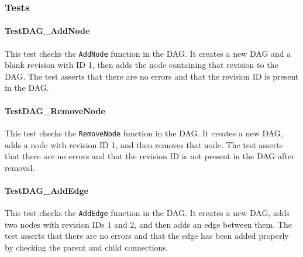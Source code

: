 \subsubsection{Tests}

\paragraph{TestDAG\_AddNode}
This test checks the \lstinline{AddNode} function in the DAG. It creates a new DAG and a blank revision with ID 1, then adds the node containing that revision to the DAG. The test asserts that there are no errors and that the revision ID is present in the DAG.

\paragraph{TestDAG\_RemoveNode}
This test checks the \lstinline{RemoveNode} function in the DAG. It creates a new DAG, adds a node with revision ID 1, and then removes that node. The test asserts that there are no errors and that the revision ID is not present in the DAG after removal.

\paragraph{TestDAG\_AddEdge}
This test checks the \lstinline{AddEdge} function in the DAG. It creates a new DAG, adds two nodes with revision IDs 1 and 2, and then adds an edge between them. The test asserts that there are no errors and that the edge has been added properly by checking the parent and child connections.

